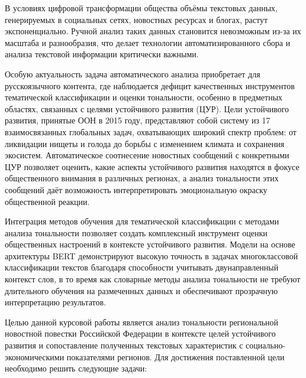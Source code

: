 \documentclass[master, och, coursework]{SCWorks1}
\begin{document}
	
	
	\tableofcontents
	
	
	
	
	
	
	\intro
	
В условиях цифровой трансформации общества объёмы текстовых данных, генерируемых в социальных сетях, новостных ресурсах и блогах, растут экспоненциально. Ручной анализ таких данных становится невозможным из-за их масштаба и разнообразия, что делает технологии автоматизированного сбора и анализа текстовой информации критически важными.

Особую актуальность задача автоматического анализа приобретает для русскоязычного контента, где наблюдается дефицит качественных инструментов тематической классификации и оценки тональности, особенно в предметных областях, связанных с целями устойчивого развития (ЦУР). Цели устойчивого развития, принятые ООН в 2015 году, представляют собой систему из 17 взаимосвязанных глобальных задач, охватывающих широкий спектр проблем: от ликвидации нищеты и голода до борьбы с изменением климата и сохранения экосистем. Автоматическое соотнесение новостных сообщений с конкретными ЦУР позволяет оценить, какие аспекты устойчивого развития находятся в фокусе общественного внимания в различных регионах, а анализ тональности этих сообщений даёт возможность интерпретировать эмоциональную окраску общественной реакции.

Интеграция методов обучения для тематической классификации с методами анализа тональности позволяет создать комплексный инструмент оценки общественных настроений в контексте устойчивого развития. Модели на основе архитектуры BERT демонстрируют высокую точность в задачах многоклассовой классификации текстов благодаря способности учитывать двунаправленный контекст слов, в то время как словарные методы анализа тональности не требуют длительного обучения на размеченных данных и обеспечивают прозрачную интерпретацию результатов.

Целью данной курсовой работы является анализ тональности региональной новостной повестки Российской Федерации в контексте целей устойчивого развития и сопоставление полученных текстовых характеристик с социально-экономическими показателями регионов. Для достижения поставленной цели необходимо решить следующие задачи:
\end{document}
